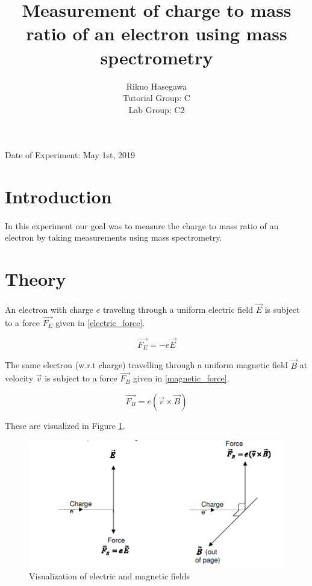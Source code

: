 \documentclass{article}
\title{Measurement of charge to mass ratio of an electron using mass spectrometry}
\author{ Rikuo Hasegawa
  \\ Tutorial Group: C
  \\ Lab Group: C2 }
\begin{document}
\maketitle
\thispagestyle{fancy}
\vspace*{\fill}
\parbox{\linewidth}{\centering%
Date of Experiment: May 1st, 2019
}
\newpage


\section{Introduction}
\paragraph{}
In this experiment our goal was to measure the charge to mass ratio of an electron by taking measurements using mass spectrometry.

\section{Theory}
\paragraph{}
An electron with charge \(e\) traveling through a uniform electric field \(\vec{E}\) is subject to a force \(\vec{F_E}\) given in \eqref{electric_force}.

\begin{equation}\label{electric_force}
  \vec{F_E} = -e\vec{E}
\end{equation}

The same electron (w.r.t charge) travelling through a uniform magnetic field \(\vec{B}\) at velocity \(\vec{v}\) is subject to a force \(\vec{F_B}\) given in \eqref{magnetic_force}.

\begin{equation}\label{magnetic_force}
  \vec{F_B} = e(\vec{v}\times\vec{B})
\end{equation}

These are visualized in Figure \ref{fig:forces}.

\begin{figure}[h]
  \includegraphics{./img/Capture.pdf}
  \caption{Visualization of electric and magnetic fields}
  \label{fig:forces}
\end{figure}
\end{document}
